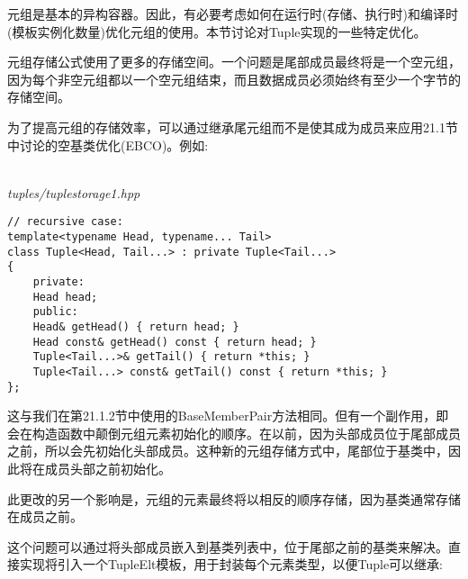 
元组是基本的异构容器。因此，有必要考虑如何在运行时(存储、执行时)和编译时(模板实例化数量)优化元组的使用。本节讨论对Tuple实现的一些特定优化。


元组存储公式使用了更多的存储空间。一个问题是尾部成员最终将是一个空元组，因为每个非空元组都以一个空元组结束，而且数据成员必须始终有至少一个字节的存储空间。

为了提高元组的存储效率，可以通过继承尾元组而不是使其成为成员来应用21.1节中讨论的空基类优化(EBCO)。例如:

\hspace*{\fill} \\ %
\noindent
\textit{tuples/tuplestorage1.hpp}
\begin{lstlisting}[style=styleCXX]
// recursive case:
template<typename Head, typename... Tail>
class Tuple<Head, Tail...> : private Tuple<Tail...>
{
	private:
	Head head;
	public:
	Head& getHead() { return head; }
	Head const& getHead() const { return head; }
	Tuple<Tail...>& getTail() { return *this; }
	Tuple<Tail...> const& getTail() const { return *this; }
};
\end{lstlisting}

这与我们在第21.1.2节中使用的BaseMemberPair方法相同。但有一个副作用，即会在构造函数中颠倒元组元素初始化的顺序。在以前，因为头部成员位于尾部成员之前，所以会先初始化头部成员。这种新的元组存储方式中，尾部位于基类中，因此将在成员头部之前初始化。

\begin{tcolorbox}[colback=webgreen!5!white,colframe=webgreen!75!black]
\hspace*{0.75cm}此更改的另一个影响是，元组的元素最终将以相反的顺序存储，因为基类通常存储在成员之前。
\end{tcolorbox}

这个问题可以通过将头部成员嵌入到基类列表中，位于尾部之前的基类来解决。直接实现将引入一个TupleElt模板，用于封装每个元素类型，以便Tuple可以继承:

